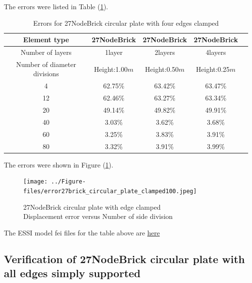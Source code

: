 \documentclass[fleqn,11pt]{article}
\begin{document}
The errors were listed in Table (\ref{table errors for 27NodeBrick circular plate with four edges clamped}).

\begin{table}[H]
  \centering
      \caption{Errors for 27NodeBrick circular plate with four edges clamped}
  \label{table errors for 27NodeBrick circular plate with four edges clamped}
\begin{tabular}{|c|c|c|c|c|}
\hline
Element type     & 27NodeBrick     & 27NodeBrick     & 27NodeBrick      \\ \hline
Number of layers & 1layer         & 2layers         & 4layers          \\ \hline
Number of diameter divisions & Height:1.00$m$ & Height:0.50$m$ & Height:0.25$m$  \\ \hline
4           & 62.75\% & 63.42\% & 63.47\%       \\ \hline
12          & 62.46\% & 63.27\% & 63.34\%       \\ \hline
20          & 49.14\% & 49.82\% & 49.91\%       \\ \hline
40          & 3.03\%  & 3.62\%  & 3.68\%        \\ \hline
60          & 3.25\%  & 3.83\%  & 3.91\%        \\ \hline
80          & 3.32\%  & 3.91\%  & 3.99\%        \\
\hline
\end{tabular}
\end{table}

The errors were shown in Figure (\ref{fig 27NodeBrick circular plate with edge clamped}).
\begin{figure}[H]
  \centering
  \texttt{[image: ../Figure-files/error27brick\_circular\_plate\_clamped100.jpeg]}
  \captionsetup{justification=centering,margin=3cm}
  \caption{27NodeBrick circular plate with edge clamped\\
      Displacement error   versus   Number of side division}
  \label{fig 27NodeBrick circular plate with edge clamped}
\end{figure}



The ESSI model fei files for the table above are \href{https://github.com/yuan-energy/ESSI_Verification/blob/master/27NodeBrick/circular_plate_clamped/circular_plate_clamped.tar.gz?raw=true}{here}






\newpage
\subsection{Verification of 27NodeBrick circular plate with all edges simply supported}
\end{document}
